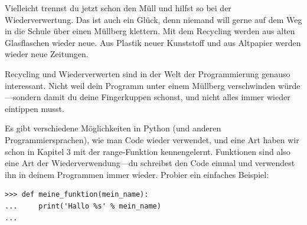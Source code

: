Vielleicht trennst du jetzt schon den Müll und hilfst so bei der Wiederverwertung. Das ist auch ein Glück, denn niemand will gerne auf dem Weg in die Schule über einen Müllberg klettern. Mit dem Recycling werden aus alten Glasflaschen wieder neue. Aus Plastik neuer Kunststoff und aus Altpapier werden wieder neue Zeitungen.

Recycling und Wiederverwerten sind in der Welt der Programmierung genauso interessant. Nicht weil dein Programm unter einem Müllberg verschwinden würde---sondern damit du deine Fingerkuppen schonst, und nicht alles immer wieder eintippen musst.

Es gibt verschiedene Möglichkeiten in Python (und anderen Programmiersprachen), wie man Code wieder verwendet, und eine Art haben wir schon in Kapitel 3 mit der range-Funktion kennengelernt. Funktionen sind also eine Art der Wiederverwendung---du schreibst den Code einmal und verwendest ihn in deinem Programmen immer wieder. Probier ein einfaches Beispiel:

\begin{Verbatim}[frame=single]
>>> def meine_funktion(mein_name):
...     print('Hallo %s' % mein_name)
...
\end{Verbatim}


